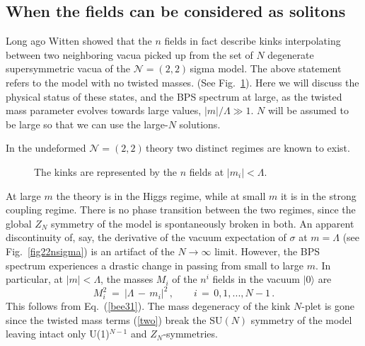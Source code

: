 \documentclass[epsfig,12pt]{article}
\def\beq{\begin{equation}}
\def\eeq{\end{equation}}
\newcommand{\ntt}{${\mathcal N}=(2,2)\,$}
\newcommand{\zn}{$Z_N$}
\def\beq{\begin{equation}}
\def\eeq{\end{equation}}
\begin{document}
{\subsection{When the  fields can be considered as solitons}
\label{wtnfcb}

Long ago Witten showed \cite{W79} that the $n$ fields in fact describe
kinks interpolating between two neighboring vacua picked up from the set of $N$ degenerate 
supersymmetric vacua
of the \ntt sigma model. The above statement refers to the model with no twisted masses.
(See Fig.~\ref{nkin}).
Here we will discuss the physical status of these states, and the BPS spectrum at large,
as the twisted mass parameter evolves towards large values, $|m|/\Lambda \gg1$.
$N$ will be assumed to be large so that we can use the large-$N$ solutions.

In the undeformed \ntt theory two distinct regimes are known to exist.
\begin{figure}
\epsfxsize=5cm
\centerline{\resizebox{5cm}{!}{}}
\caption{\small The kinks are represented by the $n$ fields at $|m_i|<\Lambda$. }
\label{nkin}
\end{figure}
At large $m$
the theory is in the Higgs regime, while at small $m$ it is in the
strong coupling regime.
There is no phase transition between the two regimes, since 
the global $Z_N$ symmetry of the model is spontaneously broken in both.
An apparent discontinuity of, say, the derivative of the vacuum expectation of $\sigma$ at
$m=\Lambda$ (see Fig.~\ref{fig22nsigma}) is an artifact of the $N\to\infty$ limit.
However, the BPS spectrum experiences a drastic change in passing from small to large $m$.
In particular, 
at $|m|<\Lambda$, the masses $M_i$ of the $n^i$ fields in the vacuum $|0\rangle$
are
\beq
M_i^2 ~=~ \left| \Lambda \,-\, m_i \right|^2\,,\qquad i\,=\,0,1, ..., N-1\,.
\label{nkma}
\eeq
This follows from Eq.~(\ref{bee31}). The mass degeneracy of the kink $N$-plet is gone
since the twisted mass terms (\ref{two}) break the SU$(N)$ symmetry of the model leaving intact only
U(1)$^{N-1}$ and \zn-symmetries.

}
\end{document}
